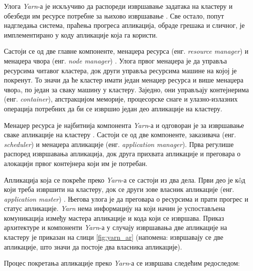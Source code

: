 \documentclass[12pt,oneside]{memoir}
\begin{document}
Улога \textit{Yarn}-а је искључиво да распореди извршавање задатака на кластеру и обезбеди им ресурсе потребне за њихово извршавање \cite{hadoop_learning}. Све остало, попут надгледања система, праћења прогреса апликација, обраде грешака и сличног, је имплементирано у коду апликације која га користи. %

Састоји се од две главне компоненте, менаџера ресурса (енг. \textit{resource manager}) и менаџера чвора (енг. \textit{node manager}) \cite{hadoop_learning}. Улога првог менаџера је да управља ресурсима читавог кластера, док други управља ресурсима машине на којој је покренут. То значи да ће кластер имати један менаџер ресурса и више менаџера чворa, по један за сваку машину у кластеру. Заједно, они управљају контејнерима (енг. \textit{container}), апстракцијом меморије, процесорске снаге и улазно-излазних операција потребних да би се извршио један део апликације на кластеру.

Менаџер ресурса је најбитнија компонента \textit{Yarn}-а и одговоран је за извршавање сваке апликације на кластеру \cite{hadoop_learning}. Састоји се од две компоненте, заказивача (енг. \textit{scheduler}) и менаџера апликације (енг. \textit{application manager}). Прва регулише распоред извршавања апликација, док друга прихвата апликације и преговара о алокацији првог контејнера који им је потребан.

Апликација која се покреће преко \textit{Yarn}-а се састоји из два дела. Први део је к\^{o}д који треба извршити на кластеру, док се други зове власник апликације (енг. \textit{application master}) \cite{hadoop_learning}. Његова улога је да преговара о ресурсима и прати прогрес и статус апликације. \textit{Yarn} нема информацију на који начин је успостављена комуникација између мастера апликације и кода који се извршава. Приказ архитектуре и компоненти \textit{Yarn}-а у случају извршавања две апликације на кластеру је приказан на слици \ref{fig:yarn_ar} (напомена: извршавају се две апликације, што значи да постоје два власника апликације).

Процес покретања апликације преко \textit{Yarn}-а се извршава следећим редоследом:
\end{document}
